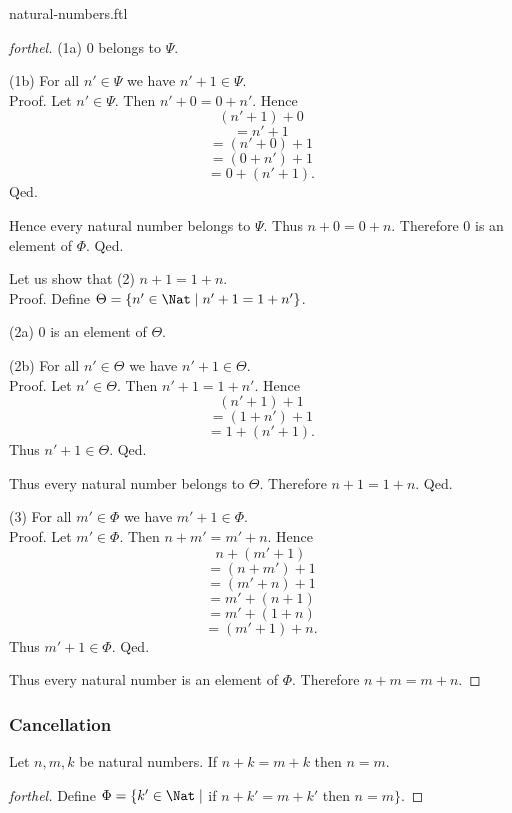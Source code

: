 \documentclass{naproche-library}
\begin{document}
\begin{smodule}{natural-numbers.ftl}
\begin{proof}[forthel]
      (1a) $0$ belongs to $\Psi$.

      (1b) For all $n' \in \Psi$ we have $n' + 1 \in \Psi$. \\
      Proof.
        Let $n' \in \Psi$.
        Then $n' + 0 = 0 + n'$.
        Hence
        \[  (n' + 1) + 0        \]
        \[    = n' + 1          \]
        \[    = (n' + 0) + 1    \]
        \[    = (0 + n') + 1    \]
        \[    = 0 + (n' + 1).   \]
      Qed.

      Hence every natural number belongs to $\Psi$.
      Thus $n + 0 = 0 + n$.
      Therefore $0$ is an element of $\Phi$.
    Qed.

    Let us show that (2) $n + 1 = 1 + n$. \\
    Proof.
      Define $\Theta = \{ n' \in \Nat \mid n' + 1 = 1 + n' \}$.

      (2a) $0$ is an element of $\Theta$.

      (2b) For all $n' \in \Theta$ we have $n' + 1 \in \Theta$. \\
      Proof.
        Let $n' \in \Theta$.
        Then $n' + 1 = 1 + n'$.
        Hence
        \[  (n' + 1) + 1        \]
        \[    = (1 + n') + 1    \]
        \[    = 1 + (n' + 1).   \]
        Thus $n' + 1 \in \Theta$.
      Qed.

      Thus every natural number belongs to $\Theta$.
      Therefore $n + 1 = 1 + n$.
    Qed.

    (3) For all $m' \in \Phi$ we have $m' + 1 \in \Phi$. \\
    Proof.
      Let $m' \in \Phi$.
      Then $n + m' = m' + n$.
      Hence
      \[  n + (m'  + 1)       \]
      \[    = (n + m') + 1    \]
      \[    = (m' + n) + 1    \]
      \[    = m' + (n + 1)    \]
      \[    = m' + (1 + n)    \]
      \[    = (m' + 1) + n.   \]
      Thus $m' + 1 \in \Phi$.
    Qed.

    Thus every natural number is an element of $\Phi$.
    Therefore $n + m = m + n$.
  \end{proof}


  \subsubsection*{Cancellation}

  \begin{proposition}[forthel,id=ARITHMETIC_03_3137702874578944]
    Let $n, m, k$ be natural numbers.
    If $n + k = m + k$ then $n = m$.
  \end{proposition}
  \begin{proof}[forthel]
    Define $\Phi = \{ k' \in \Nat \mid$ if $n + k' = m + k'$ then $n = m \}$.


\end{proof}
\end{smodule}
\end{document}
